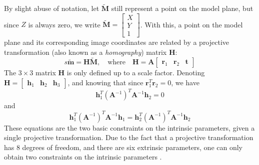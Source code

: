 By slight abuse of notation, let $\tilde{\mathbf{M}}$ still represent a point on the model plane, but since $Z$ is always zero, we write $\tilde{\mathbf{M}}=\begin{bmatrix}X\\Y\\1\end{bmatrix}$. With this, a point on the model plane and its corresponding image coordinates are related by a projective transformation (also known as a \textit{homography}) matrix $\mathbf{H}$:
\begin{equation}
\label{eq:homography}
    s\tilde{\mathbf{m}}=\mathbf{H}\tilde{\mathbf{M}},\quad\text{where}\quad \mathbf{H}=\mathbf{A}\begin{bmatrix}\mathbf{r}_1 & \mathbf{r}_2 & \mathbf{t}\end{bmatrix}
\end{equation}
The $3\times3$ matrix $\mathbf{H}$ is only defined up to a scale factor. Denoting $\mathbf{H}=\begin{bmatrix}\mathbf{h}_1 & \mathbf{h}_2 & \mathbf{h}_3\end{bmatrix}$, and knowing that since $\mathbf{r}_1^T\mathbf{r}_2=0$, we have
\begin{equation}
\label{eq:intrinsic_constraints}
    \mathbf{h}_1^T(\mathbf{A}^{-1})^T\mathbf{A}^{-1}\mathbf{h}_2=0
\end{equation}
and
\begin{equation}
    \mathbf{h}_1^T(\mathbf{A}^{-1})^T\mathbf{A}^{-1}\mathbf{h}_1=\mathbf{h}_2^T(\mathbf{A}^{-1})^T\mathbf{A}^{-1}\mathbf{h}_2
\end{equation}
These equations are the two basic constraints on the intrinsic parameters, given a single projective transformation. Due to the fact that a projective transformation has 8 degrees of freedom, and there are six extrinsic parameters, one can only obtain two constraints on the intrinsic parameters \cite{flexCal}.
